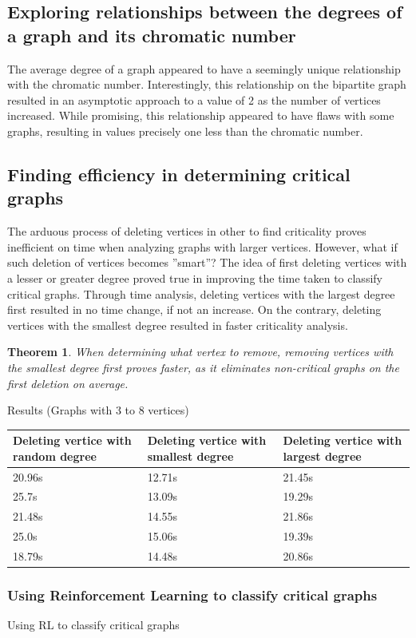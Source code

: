\documentclass[12pt, letterpaper, twoside]{article}
\newtheorem{theorem}{Theorem}
\begin{document}
\subsection{Exploring relationships between the degrees of a graph and its chromatic number}
The average degree of a graph appeared to have a seemingly unique relationship with the chromatic number. 
Interestingly, this relationship on the bipartite graph resulted in an asymptotic approach to a value of 2 as the number of vertices increased. 
While promising, this relationship appeared to have flaws with some graphs, resulting in values precisely one less than the chromatic number.  

\subsection{Finding efficiency in determining critical graphs}
The arduous process of deleting vertices in other to find criticality proves inefficient on time when analyzing graphs with larger vertices. 
However, what if such deletion of vertices becomes ''smart''?
The idea of first deleting vertices with a lesser or greater degree proved true in improving the time taken to classify critical graphs.
Through time analysis, deleting vertices with the largest degree first resulted in no time change, if not an increase. On the contrary, deleting vertices with the smallest degree resulted in faster criticality analysis.

\begin{theorem}
When determining what vertex to remove, removing vertices with the smallest degree first proves faster, as it eliminates non-critical graphs on the first deletion on average. 
\end{theorem}

Results (Graphs with 3 to 8 vertices)

\begin{tabularx}{0.9\textwidth} { 
  | >{\raggedright\arraybackslash}X 
  | >{\centering\arraybackslash}X 
  | >{\raggedleft\arraybackslash}X | }
  
\toprule
Deleting vertice with random degree & Deleting vertice with smallest degree & Deleting vertice with largest degree \\
\midrule

 20.96s & 12.71s & 21.45s \\
 \hline
 25.7s  & 13.09s  & 19.29s  \\
 \hline
 21.48s  & 14.55s  & 21.86s  \\
 \hline
 25.0s  & 15.06s  & 19.39s  \\
 \hline
 18.79s  & 14.48s  & 20.86s  \\

\hline
\end{tabularx}

\subsubsection{Using Reinforcement Learning to classify critical graphs}
Using RL to classify critical graphs
\end{document}
